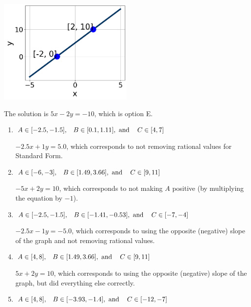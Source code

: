 \documentclass{extbook}[14pt]
\begin{document}
\begin{enumerate}
{\begin{center}
    \includegraphics[width=0.5\textwidth]{../Figures/linearGraphToStandardCopyC.png}
\end{center}


The solution is \( 5x - 2y = -10 \), which is option E.\begin{enumerate}[label=\Alph*.]
\item \( A \in [-2.5, -1.5], \hspace{3mm} B \in [0.1, 1.11], \text{ and } \hspace{3mm} C \in [4, 7] \)

 $-2.5x + 1y = 5.0$, which corresponds to not removing rational values for Standard Form.
\item \( A \in [-6, -3], \hspace{3mm} B \in [1.49, 3.66], \text{ and } \hspace{3mm} C \in [9, 11] \)

 $-5x + 2y = 10$, which corresponds to not making $A$ positive (by multiplying the equation by $-1$).
\item \( A \in [-2.5, -1.5], \hspace{3mm} B \in [-1.41, -0.53], \text{ and } \hspace{3mm} C \in [-7, -4] \)

 $-2.5x - 1y = -5.0$, which corresponds to using the opposite (negative) slope of the graph and not removing rational values.
\item \( A \in [4, 8], \hspace{3mm} B \in [1.49, 3.66], \text{ and } \hspace{3mm} C \in [9, 11] \)

 $5x + 2y = 10$, which corresponds to using the opposite (negative) slope of the graph, but did everything else correctly.
\item \( A \in [4, 8], \hspace{3mm} B \in [-3.93, -1.4], \text{ and } \hspace{3mm} C \in [-12, -7] \)


\end{enumerate}}
\end{enumerate}
\end{document}
